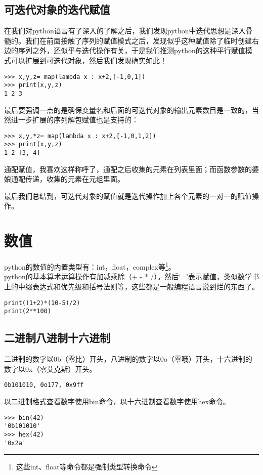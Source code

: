 \documentclass[12pt,oneside]{book}
\begin{document}
\begin{common-format}
\subsection{可迭代对象的迭代赋值}
在我们对python语言有了深入的了解之后，我们发现python中迭代思想是深入骨髓的。我们在前面接触了序列的赋值模式之后，发现似乎这种赋值除了临时创建右边的序列之外，还似乎与迭代操作有关，于是我们推测python的这种平行赋值模式可以扩展到可迭代对象，然后我们发现确实如此！
\begin{Verbatim}
>>> x,y,z= map(lambda x : x+2,[-1,0,1])
>>> print(x,y,z)
1 2 3
\end{Verbatim}

最后要强调一点的是确保变量名和后面的可迭代对象的输出元素数目是一致的，当然进一步扩展的序列解包赋值也是支持的：
\begin{Verbatim}
>>> x,y,*z= map(lambda x : x+2,[-1,0,1,2])
>>> print(x,y,z)
1 2 [3, 4]
\end{Verbatim}
通配赋值，我喜欢这样称呼了，通配之后收集的元素在列表里面；而函数参数的婆娘通配传递，收集的元素在元组里面。

最后我们总结到，可迭代对象的赋值就是迭代操作加上各个元素的一对一的赋值操作。


\section{数值}
python的数值的内置类型有：int，float，complex等\footnote{这些int、float等命令都是强制类型转换命令}。\\python的基本算术运算操作有加减乘除（+ - * /）。然后‘=’表示赋值，类似数学书上的中缀表达式和优先级和括号法则等，这些都是一般编程语言说到烂的东西了。

\begin{Verbatim}
print((1+2)*(10-5)/2)
print(2**100)
\end{Verbatim}

\subsection{二进制八进制十六进制}
二进制的数字以0b（零比）开头，八进制的数字以0o（零哦）开头，十六进制的数字以0x（零艾克斯）开头。
\begin{Verbatim}
0b101010, 0o177, 0x9ff
\end{Verbatim}

以二进制格式查看数字使用bin命令，以十六进制查看数字使用hex命令。
\begin{Verbatim}
>>> bin(42)
'0b101010'
>>> hex(42)
'0x2a'
\end{Verbatim}


\end{common-format}
\end{document}
